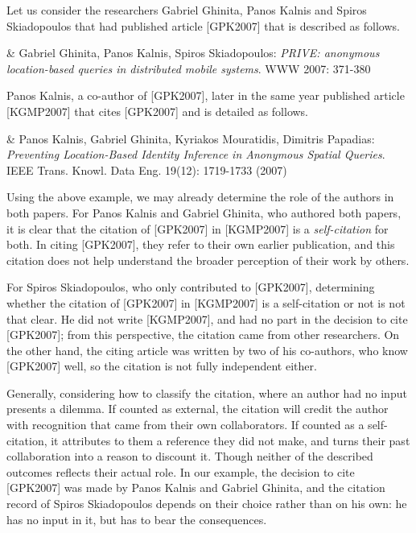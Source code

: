 Let us consider the researchers
Gabriel Ghinita, Panos Kalnis and Spiros Skiadopoulos
that had published article [GPK2007]
that is described as follows.

\begin{myquote}
[GPK2007] & Gabriel Ghinita, Panos Kalnis, Spiros Skiadopoulos:
\emph{PRIVE: anonymous location-based queries in distributed mobile systems}. WWW 2007: 371-380
\end{myquote}

Panos Kalnis, a co-author of [GPK2007], later in the same year published article [KGMP2007]
that cites [GPK2007] and is detailed as follows.

\begin{myquote}
[KGMP2007] & Panos Kalnis, Gabriel Ghinita, Kyriakos Mouratidis, Dimitris Papadias:
\emph{Preventing Location-Based Identity Inference in Anonymous Spatial Queries}. IEEE Trans. Knowl. Data Eng. 19(12): 1719-1733 (2007)
\end{myquote}

Using the above example, we may already determine the role of the authors in both papers.
For Panos Kalnis and Gabriel Ghinita, who authored both papers, it is clear that the citation of [GPK2007] in [KGMP2007] is a \emph{self-citation} for both.
In citing [GPK2007], they refer to their own earlier publication, and this citation does not help understand the broader perception of their work by others.

For Spiros Skiadopoulos, who only contributed to [GPK2007], determining whether the citation of [GPK2007] in [KGMP2007] is a self-citation or not is not that clear.
He did not write [KGMP2007], and had no part in the decision to cite [GPK2007]; from this perspective, the citation came from other researchers.
On the other hand, the citing article was written by two of his co-authors, who know [GPK2007] well, so the citation is not fully independent either.

Generally, considering how to classify the citation, where an author had no input presents a dilemma.
If counted as external, the citation will credit the author with recognition that came from their own collaborators.
If counted as a self-citation, it attributes to them a reference they did not make, and turns their past collaboration into a reason to discount it.
Though neither of the described outcomes reflects their actual role.
In our example, the decision to cite [GPK2007] was made by Panos Kalnis and Gabriel Ghinita, and the citation record of Spiros Skiadopoulos depends on their choice rather than on his own: he has no input in it, but has to bear the consequences.

